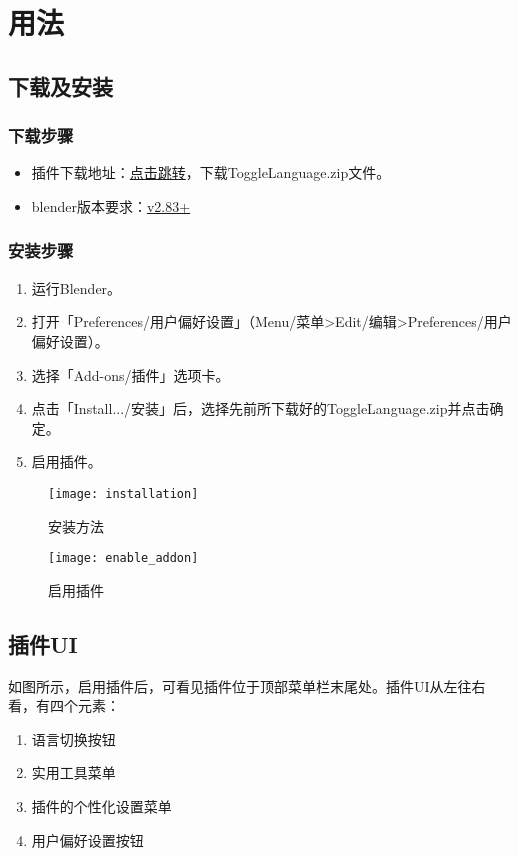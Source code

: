 \documentclass{../../public_resources/doc}
\begin{document}
\section{用法}
\subsection{下载及安装}
\subsubsection{下载步骤}
\begin{itemize}
    \item 插件下载地址：\href{https://github.com/Mister-Kin/ToggleLanguage/releases/latest}{点击跳转}，下载ToggleLanguage.zip文件。
    \item blender版本要求：\href{https://www.blender.org/download/}{v2.83+}
\end{itemize}

\subsubsection{安装步骤}
\begin{enumerate}
    \item 运行Blender。
    \item 打开「Preferences/用户偏好设置」（Menu/菜单>Edit/编辑>Preferences/用户偏好设置）。
    \item 选择「Add-ons/插件」选项卡。
    \item 点击「Install.../安装」后，选择先前所下载好的ToggleLanguage.zip并点击确定。
    \item 启用插件。
\end{enumerate}

\begin{figure}[h!]
    \begin{minipage}[t]{0.48\linewidth}
        \texttt{[image: installation]}
        \caption{安装方法}
    \end{minipage}
    \quad
    \begin{minipage}[t]{0.48\linewidth}
        \texttt{[image: enable\_addon]}
        \caption{启用插件}
        \label{启用插件}
    \end{minipage}
\end{figure}

\subsection{插件UI}
\label{插件UI小节}
如图所示，启用插件后，可看见插件位于顶部菜单栏末尾处。插件UI从左往右看，有四个元素：
\begin{enumerate}
    \item 语言切换按钮
    \item 实用工具菜单
    \item 插件的个性化设置菜单
    \item 用户偏好设置按钮
\end{enumerate}
\end{document}
